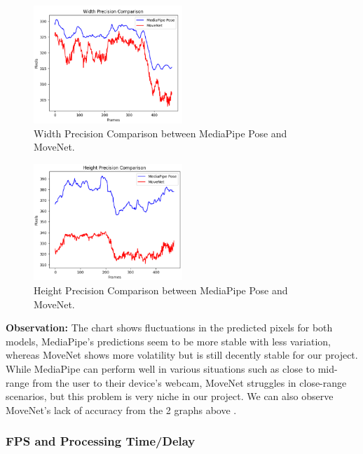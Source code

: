 \documentclass[12pt]{article}
\begin{document}
\FloatBarrier

\begin{figure}[ht]
    \centering
    \includegraphics[width=0.5\textwidth]{prew.png}
    \caption{Width Precision Comparison between MediaPipe Pose and MoveNet.}
\end{figure}

\FloatBarrier

\begin{figure}[ht]
    \centering
    \includegraphics[width=0.5\textwidth]{preh.png}
    \caption{Height Precision Comparison between MediaPipe Pose and MoveNet.}
\end{figure}

\FloatBarrier

\textbf{Observation:} The chart shows fluctuations in the predicted pixels for both models, MediaPipe’s predictions seem to be more stable with less variation, whereas MoveNet shows more volatility but is still decently stable for our project. While MediaPipe can perform well in various situations such as close to mid-range from the user to their device’s webcam, MoveNet struggles in close-range scenarios, but this problem is very niche in our project. We can also observe MoveNet’s lack of accuracy from the 2 graphs above \cite{chung2022}.

\subsubsection{FPS and Processing Time/Delay}
\end{document}
